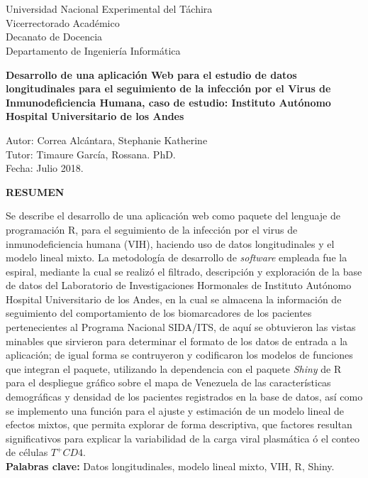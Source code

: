 \chapter*{}
\pagestyle{empty}
\thispagestyle{empty}

\begin{center}
\vspace*{-4cm}
Universidad Nacional Experimental del T\'achira\\
Vicerrectorado Acad\'emico\\
Decanato de Docencia\\
Departamento de Ingenier\'ia Inform\'atica\\

\end{center}
\begin{center}
\textbf{Desarrollo de una aplicaci\'on Web para el estudio de datos longitudinales para el seguimiento de la infecci\'on por el Virus de Inmunodeficiencia Humana, caso de estudio: Instituto Aut\'onomo Hospital Universitario de los Andes}
\end{center}
\begin{flushright}
Autor: Correa Alc\'antara, Stephanie Katherine \\
Tutor:  Timaure Garc\'ia, Rossana. PhD. \\
Fecha: Julio 2018.\\
\end{flushright}

\small{
\begin{center}
\textbf{RESUMEN}
\end{center}

\noindent
Se describe el desarrollo de una aplicaci\'on web como paquete del lenguaje de programaci\'on R,  para el seguimiento de la infecci\'on por el virus de inmunodeficiencia humana (VIH), haciendo uso de datos longitudinales y el modelo lineal mixto. La metodolog\'ia de desarrollo de  \textit{software} empleada fue la espiral, mediante la cual se realiz\'o el filtrado, descripción y exploraci\'on de la base de datos del Laboratorio de Investigaciones Hormonales de Instituto Aut\'onomo Hospital Universitario de los Andes, en la cual se almacena la informaci\'on de seguimiento del comportamiento de los biomarcadores de los pacientes pertenecientes al Programa Nacional SIDA/ITS, de aqu\'i se obtuvieron las vistas minables que sirvieron para determinar el formato de los datos de entrada a la aplicaci\'on;  de igual forma se contruyeron y codificaron los modelos de funciones que integran el paquete, utilizando la dependencia con el paquete  \textit{Shiny} de R para el despliegue gr\'afico sobre el mapa de Venezuela de las caracter\'isticas demogr\'aficas y densidad de los pacientes registrados en la base de datos, as\'i como se implemento una funci\'on para el ajuste y estimaci\'on de un modelo lineal de efectos mixtos, que permita explorar de forma descriptiva, que factores resultan significativos para explicar la variabilidad de la carga viral plasm\'atica \'o el conteo de c\'elulas $T^{+}CD4$. \\

\noindent
\textbf{Palabras clave:} Datos longitudinales, modelo lineal mixto, VIH, R, Shiny.
}


